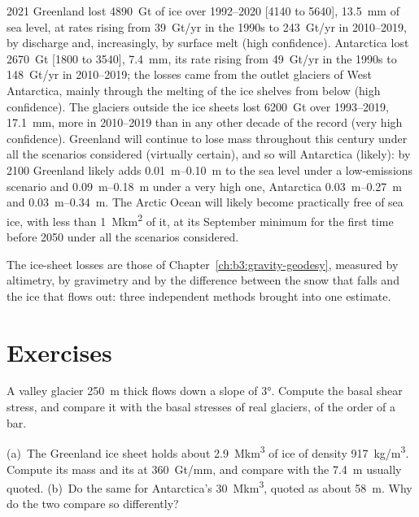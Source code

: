 \begin{dated}{2021}
Greenland lost \qty{4890}{Gt} of ice over 1992--2020 [4140 to 5640],
\qty{13.5}{mm} of sea level, at rates rising from \qty{39}{Gt/yr} in the
1990s to \qty{243}{Gt/yr} in 2010--2019, by discharge and, increasingly,
by surface melt (high confidence). Antarctica lost \qty{2670}{Gt}
[1800 to 3540], \qty{7.4}{mm}, its rate rising from \qty{49}{Gt/yr} in the
1990s to \qty{148}{Gt/yr} in 2010--2019; the losses came from the outlet glaciers of West
Antarctica, mainly through the melting of the ice shelves from below (high
confidence). The glaciers outside the ice sheets lost \qty{6200}{Gt} over
1993--2019, \qty{17.1}{mm}, more in 2010--2019 than in any other decade of
the record (very high confidence). Greenland will continue to lose mass
throughout this century under all the scenarios considered (virtually
certain), and so will Antarctica (likely): by 2100 Greenland likely adds
\qtyrange{0.01}{0.10}{m} to the sea level under a low-emissions scenario
and \qtyrange{0.09}{0.18}{m} under a very high one, Antarctica
\qtyrange{0.03}{0.27}{m} and \qtyrange{0.03}{0.34}{m}. The Arctic Ocean
will likely become practically free of sea ice, with less than
\qty{1}{\mega km^2} of it, at its September minimum for the first time
before 2050 under all the scenarios considered.
\end{dated}

The ice-sheet losses are those of Chapter~\ref{ch:b3:gravity-geodesy},
measured by altimetry, by gravimetry and by the difference between the snow
that falls and the ice that flows out: three independent methods brought
into one estimate.

\section{Exercises}

\begin{exercise}[$\star$]\label{exo:b3:glaciology:1}
A valley glacier \qty{250}{m} thick flows down a slope of \ang{3}. Compute
the basal shear stress, and compare it with the basal stresses of real
glaciers, of the order of a bar.
\end{exercise}

\begin{exercise}[$\star$]\label{exo:b3:glaciology:2}
(a)~The Greenland ice sheet holds about \qty{2.9}{\mega km^3} of ice of
density \qty{917}{kg/m^3}. Compute its mass and its  at
\qty{360}{Gt/mm}, and compare with the \qty{7.4}{m} usually quoted.
(b)~Do the same for Antarctica's \qty{30}{\mega km^3}, quoted as about
\qty{58}{m}. Why do the two compare so differently?
\end{exercise}

